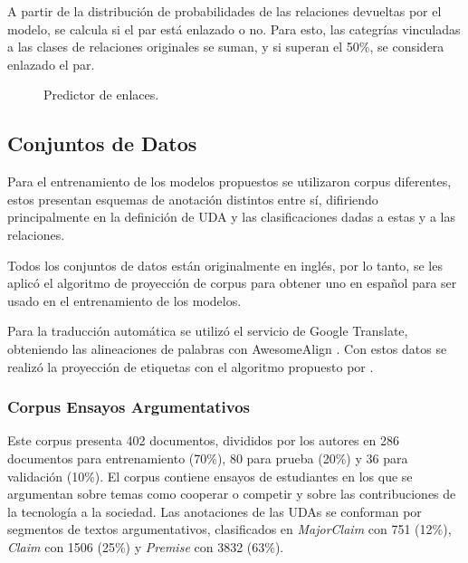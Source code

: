 \documentclass{rcci} %
\begin{document}
A partir de la distribuci\'on de probabilidades de las relaciones devueltas por el modelo,
se calcula si el par est\'a enlazado o no. Para esto, las categr\'ias vinculadas a las clases de relaciones 
originales se suman, y si superan el 50\%, se considera enlazado el par.

\begin{figure}[!h]
	\begin{center}
		
		
	\end{center}
	\caption{\fontsize{11}{12}\selectfont Predictor de enlaces.}
	\label{fig:link_predictor_model1}
\end{figure}

\subsection*{Conjuntos de Datos}

Para el entrenamiento de los modelos propuestos se utilizaron corpus diferentes, estos
presentan esquemas de anotaci\'on distintos entre s\'i, difiriendo principalmente en la definici\'on de UDA y 
las clasificaciones dadas a estas y a las relaciones.

Todos los conjuntos de datos est\'an originalmente en ingl\'es, por lo tanto, se les aplic\'o el algoritmo de proyecci\'on
de corpus para obtener uno en espa\~nol para ser usado en el entrenamiento de los modelos.

Para la traducci\'on autom\'atica se utiliz\'o el servicio de Google Translate,
obteniendo las alineaciones de palabras con AwesomeAlign \cite{dou2021word}.
Con estos datos se realiz\'o la proyecci\'on de etiquetas con el algoritmo propuesto 
por \citep{eger2018cross}.

\subsubsection*{Corpus Ensayos Argumentativos}\label{corpus:persuasive_essays}

Este corpus \cite{stab2017parsing} presenta 402 documentos, divididos por los autores en 286 documentos para entrenamiento (70\%), 
80 para prueba (20\%) y 36 para validaci\'on (10\%). El corpus contiene ensayos de estudiantes en los que 
se argumentan sobre temas como cooperar o competir y sobre las contribuciones de la tecnolog\'ia a la sociedad.
Las anotaciones de las UDAs se conforman por segmentos de textos argumentativos,
clasificados en \textit{MajorClaim} con 751 (12\%), \textit{Claim} con 1506 (25\%) y \textit{Premise} con 3832 (63\%).
\end{document}
